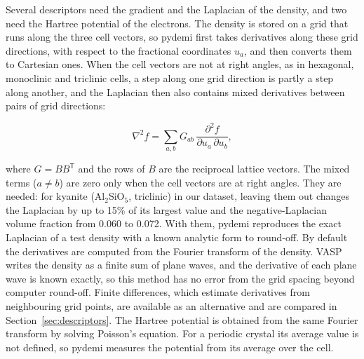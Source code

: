 \documentclass[journal=jctcce,manuscript=article,email=true]{achemso}
\begin{document}
Several descriptors need the gradient and the Laplacian of the density, and
two need the Hartree potential of the electrons. The density is stored on a grid
that runs along the three cell vectors, so pydemi first takes derivatives along
these grid directions, with respect to the fractional coordinates $u_a$, and
then converts them to Cartesian ones. When the cell vectors are not at right
angles, as in hexagonal, monoclinic and triclinic cells, a step along one grid
direction is partly a step along another, and the Laplacian then also contains
mixed derivatives between pairs of grid directions:
\begin{linenomath*}
\[
\nabla^2 f=\sum_{a,b}G_{ab}\,\frac{\partial^2 f}{\partial u_a\,\partial u_b},
\]
\end{linenomath*}
where $G=BB^{\mathsf T}$ and the rows of $B$ are the reciprocal lattice vectors.
The mixed terms ($a\neq b$) are zero only when the cell vectors are at right
angles. They are needed: for kyanite (Al$_2$SiO$_5$, triclinic) in our dataset,
leaving them out changes the Laplacian by up to 15\% of its largest value and
the negative-Laplacian volume fraction from 0.060 to 0.072. With them, pydemi
reproduces the exact Laplacian of a test density with a known analytic form to
round-off. By default the derivatives are computed from the Fourier transform of
the density. VASP writes the density as a finite sum of plane waves, and the
derivative of each plane wave is known exactly, so this method has no error from
the grid spacing beyond computer round-off. Finite differences, which estimate
derivatives from neighbouring grid points, are available as an alternative and
are compared in Section~\ref{sec:descriptors}. The Hartree potential is obtained
from the same Fourier transform by solving Poisson's equation. For a periodic
crystal its average value is not defined, so pydemi measures the potential from
its average over the cell.
\end{document}
